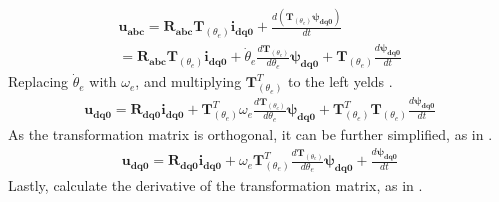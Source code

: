 \begin{equation}
	\begin{aligned}
		\mathbf{u_{abc}}
		=
		\mathbf{R_{abc}}
		\mathbf{T}_{(\theta_e)} \mathbf{i_{dq0}}
		+
		\frac{d\left(\mathbf{T}_{(\theta_e)} \pmb{\psi_{dq0}}\right)}{dt}
		\\
		=
		\mathbf{R_{abc}}
		\mathbf{T}_{(\theta_e)} \mathbf{i_{dq0}}
		+\dot{\theta}_e\frac{d\mathbf{T}_{(\theta_e)}}{d\theta_e}\pmb{\psi_{dq0}}
		+\mathbf{T}_{(\theta_e)}\frac{d \pmb{\psi_{dq0}}}{dt}
	\end{aligned}
	\label{eq:voltage_balance_dq0_intermediary}
\end{equation}
Replacing $\dot{\theta}_e$ with $\omega_e$, and multiplying $\mathbf{T}^T_{(\theta_e)}$ to the left yelds .
\begin{equation}
	\begin{aligned}
		\mathbf{u_{dq0}}
		=
		\mathbf{R_{dq0}}\mathbf{i_{dq0}}
		+\mathbf{T}^T_{(\theta_e)}\omega_e\frac{d\mathbf{T}_{(\theta_e)}}{d\theta_e}\pmb{\psi_{dq0}}
		+\mathbf{T}^T_{(\theta_e)}\mathbf{T}_{(\theta_e)}\frac{d \pmb{\psi_{dq0}}}{dt}
	\end{aligned}
	\label{eq:voltage_balance_dq0_intermediary2}
\end{equation}
As the transformation matrix is orthogonal, it can be further simplified, as in .
\begin{equation}
	\begin{aligned}
		\mathbf{u_{dq0}}
		=
		\mathbf{R_{dq0}}\mathbf{i_{dq0}}
		+\omega_e\mathbf{T}^T_{(\theta_e)}\frac{d\mathbf{T}_{(\theta_e)}}{d\theta_e}\pmb{\psi_{dq0}}
		+\frac{d \pmb{\psi_{dq0}}}{dt}
	\end{aligned}
	\label{eq:voltage_balance_dq0_intermediary3}
\end{equation}
Lastly, calculate the derivative of the transformation matrix, as in .
